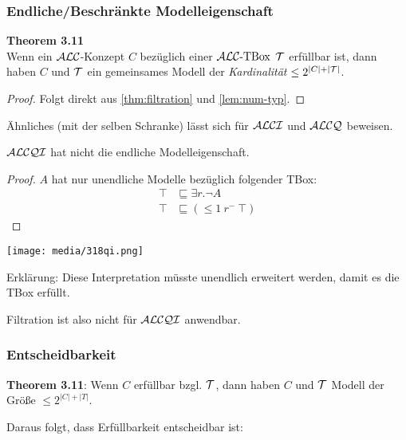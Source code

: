 \subsubsection{Endliche/Beschränkte Modelleigenschaft}

\textbf{Theorem 3.11} \\
Wenn ein $\mathcal{A}\mathcal{L}\mathcal{C}$-Konzept $C$ bezüglich einer $\text{$\mathcal{A}\mathcal{L}\mathcal{C}$-TBox}$ $\mathcal{T}$ erfüllbar ist, dann haben $C$ und $\mathcal{T}$ ein gemeinsames Modell der
\emph{Kardinalität} $\leq 2^{\left| C \right| + |\MT|}$.

\begin{proof}
    Folgt direkt aus \autoref{thm:filtration} und \autoref{lem:num-typ}.
\end{proof}

Ähnliches (mit der selben Schranke) lässt sich für $\mathcal{A}\mathcal{L}\mathcal{C}\mathcal{I}$ und $\mathcal{A}\mathcal{L}\mathcal{C}\mathcal{Q}$ beweisen.

\begin{theorem}
$\mathcal{A}\mathcal{L}\mathcal{C}\mathcal{Q}\mathcal{I}$ hat nicht die endliche Modelleigenschaft.
\end{theorem}

\begin{proof}
    $A$ hat nur unendliche Modelle bezüglich folgender TBox:
    \begin{align*}
        \top &\sqsubseteq \exists r.\neg A\\
        \top &\sqsubseteq ( \leq 1\ r^{-}\ \top)
    \end{align*}
\end{proof}
\begin{tafel}\mbox{}

\texttt{[image: media/318qi.png]}

Erklärung: Diese Interpretation müsste unendlich erweitert werden, damit es die TBox erfüllt.
\end{tafel}

Filtration ist also nicht für $\mathcal{A}\mathcal{L}\mathcal{C}\mathcal{Q}\mathcal{I}$ anwendbar.

\subsubsection{Entscheidbarkeit}
\textbf{Theorem 3.11}:
Wenn $C$ erfüllbar bzgl. $\mathcal{T}$, dann haben $C$ und $\mathcal{T}$ Modell der
Größe $\leq 2^{\left| C \right| + \left| T \right|}$.

Daraus folgt, dass Erfüllbarkeit entscheidbar ist:


